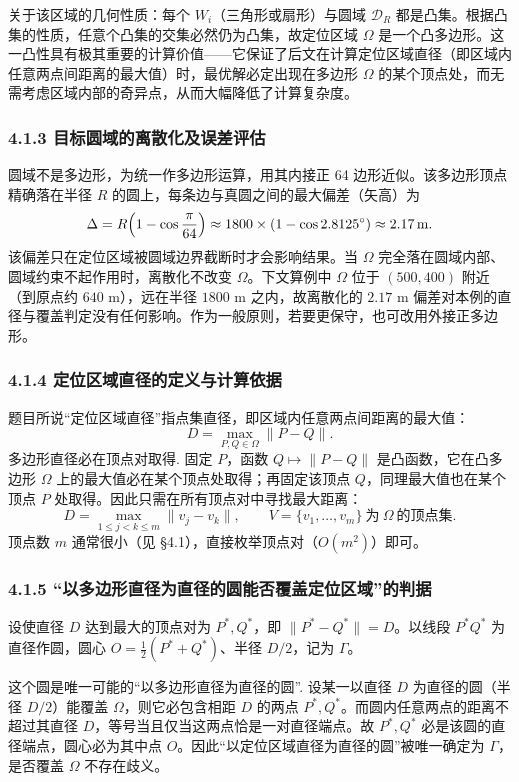 \documentclass[UTF8, zihao=5,AutoFakeBold=2]{ctexart}
\begin{document}
关于该区域的几何性质：每个 \(W_i\)（三角形或扇形）与圆域 \(\mathcal{D}_R\) 都是凸集。根据凸集的性质，任意个凸集的交集必然仍为凸集，故定位区域 \(\Omega\) 是一个凸多边形。这一凸性具有极其重要的计算价值——它保证了后文在计算定位区域直径（即区域内任意两点间距离的最大值）时，最优解必定出现在多边形 \(\Omega\) 的某个顶点处，而无需考虑区域内部的奇异点，从而大幅降低了计算复杂度。

\subsubsection*{4.1.3 \quad 目标圆域的离散化及误差评估}


圆域不是多边形，为统一作多边形运算，用其内接正 64 边形近似。该多边形顶点精确落在半径 \(R\) 的圆上，每条边与真圆之间的最大偏差（矢高）为\[\Delta = R\Bigl(1-\cos\frac{\pi}{64}\Bigr) \approx 1800 \times (1-\cos 2.8125^{\circ}) \approx 2.17\,\text{m}.
\]
该偏差只在定位区域被圆域边界截断时才会影响结果。当 \(\Omega\) 完全落在圆域内部、圆域约束不起作用时，离散化不改变 \(\Omega\)。下文算例中 \(\Omega\) 位于 \((500, 400)\) 附近（到原点约 \(640\) m），远在半径 \(1800\) m 之内，故离散化的 \(2.17\) m 偏差对本例的直径与覆盖判定没有任何影响。作为一般原则，若要更保守，也可改用外接正多边形。

	

	\subsubsection*{4.1.4 \quad 定位区域直径的定义与计算依据}
	题目所说“定位区域直径”指点集直径，即区域内任意两点间距离的最大值：
	\[
		D=\max_{P,Q\in\Omega}\lVert P-Q\rVert .
	\]
	多边形直径必在顶点对取得. 固定 \(P\)，函数 \(Q\mapsto\lVert P-Q\rVert\) 是凸函数，它在凸多边形 \(\Omega\) 上的最大值必在某个顶点处取得；再固定该顶点 \(Q\)，同理最大值也在某个顶点 \(P\) 处取得。因此只需在所有顶点对中寻找最大距离：
	\[
		D=\max_{1\le j<k\le m}\lVert v_j-v_k\rVert,\qquad
		V=\{v_1,\dots,v_m\}\ \text{为}\ \Omega\ \text{的顶点集}.
	\]
	顶点数 \(m\) 通常很小（见 \S4.1），直接枚举顶点对（\(O(m^2)\)）即可。

	\subsubsection*{4.1.5 \quad “以多边形直径为直径的圆能否覆盖定位区域”的判据}
	设使直径 \(D\) 达到最大的顶点对为 \(P^*,Q^*\)，即 \(\lVert P^*-Q^*\rVert=D\)。以线段 \(P^*Q^*\) 为直径作圆，圆心 \(O=\tfrac12(P^*+Q^*)\)、半径 \(D/2\)，记为 \(\Gamma\)。

	这个圆是唯一可能的“以多边形直径为直径的圆”. 设某一以直径 \(D\) 为直径的圆（半径 \(D/2\)）能覆盖 \(\Omega\)，则它必包含相距 \(D\) 的两点 \(P^*,Q^*\)。而圆内任意两点的距离不超过其直径 \(D\)，等号当且仅当这两点恰是一对直径端点。故 \(P^*,Q^*\) 必是该圆的直径端点，圆心必为其中点 \(O\)。因此“以定位区域直径为直径的圆”被唯一确定为 \(\Gamma\)，是否覆盖 \(\Omega\) 不存在歧义。
\end{document}
